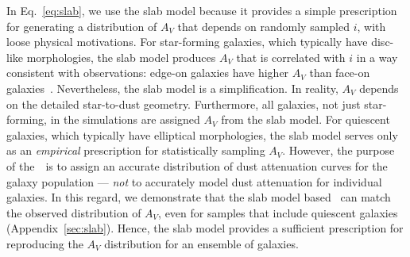 In Eq.~\ref{eq:slab}, we use the slab model because it provides a simple
prescription for generating a distribution of $A_V$ that depends on
randomly sampled $i$, with loose physical motivations.
For star-forming galaxies, which typically have disc-like morphologies, the
slab model produces $A_V$ that is correlated with $i$ in a way consistent
with observations: edge-on galaxies have higher $A_V$ than face-on
galaxies~\citep[\eg][]{conroy2010, wild2011, battisti2017, salim2020}.
Nevertheless, the slab model is a simplification. 
In reality, $A_V$ depends on the detailed star-to-dust geometry.
Furthermore, all galaxies, not just star-forming, in the simulations are
assigned $A_V$ from the slab model.
For quiescent galaxies, which typically have elliptical morphologies, the
slab model serves only as an \emph{empirical} prescription for statistically 
sampling $A_V$. 
However, the purpose of the~\eda~is to assign an accurate distribution of dust
attenuation curves for the galaxy population --- \emph{not} to accurately
model dust attenuation for individual galaxies.
In this regard, we demonstrate that the slab model based \eda~can match the
observed distribution of $A_V$, even for samples that include quiescent
galaxies (Appendix~\ref{sec:slab}).
Hence, the slab model provides a sufficient prescription for reproducing
the $A_V$ distribution for an ensemble of galaxies. 

